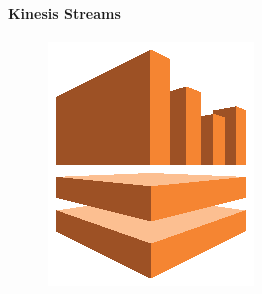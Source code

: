 \documentclass[
12pt,
english,
ngerman,
headsepline,
twoside,
openright,
numbers=noenddot,version=first
]{scrreprt}
\begin{document}
\paragraph{Kinesis Streams}
\begin{figure}
	\includegraphics[width=0.9\linewidth]{./pics/aws/Analytics_AmazonKinesis.eps}
\end{figure}
\end{document}

